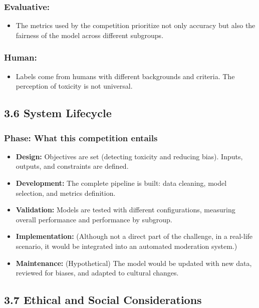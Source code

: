 \documentclass[a4paper,12pt]{article}
\begin{document}
\subsubsection*{Evaluative:}
\begin{itemize}
    \item The metrics used by the competition prioritize not only accuracy but also the fairness of the model across different subgroups.
\end{itemize}

\subsubsection*{Human:}
\begin{itemize}
    \item Labels come from humans with different backgrounds and criteria. The perception of toxicity is not universal.
\end{itemize}

\subsection*{3.6 System Lifecycle}

\subsubsection*{Phase: What this competition entails}
\begin{itemize}
    \item \textbf{Design:} Objectives are set (detecting toxicity and reducing bias). Inputs, outputs, and constraints are defined.
    \item \textbf{Development:} The complete pipeline is built: data cleaning, model selection, and metrics definition.
    \item \textbf{Validation:} Models are tested with different configurations, measuring overall performance and performance by subgroup.
    \item \textbf{Implementation:} (Although not a direct part of the challenge, in a real-life scenario, it would be integrated into an automated moderation system.)
    \item \textbf{Maintenance:} (Hypothetical) The model would be updated with new data, reviewed for biases, and adapted to cultural changes.
\end{itemize}

\subsection*{3.7 Ethical and Social Considerations}
\end{document}
